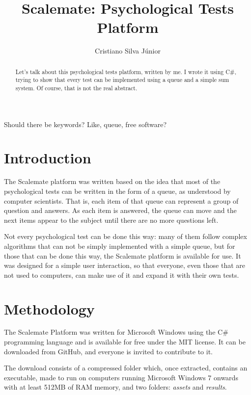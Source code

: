 \documentclass[12pt, a4paper, twoside]{article}
\begin{document}
\title{Scalemate: Psychological Tests Platform}
\author{Cristiano Silva Júnior}
\date{}
\maketitle

\begin{abstract}
Let's talk about this psychological tests platform, written by me. I wrote it
using C\#, trying to show that every test can be implemented using a queue
and a simple sum system. Of course, that is not the real abstract. 
\end{abstract}

Should there be keywords? Like, queue, free software?

\section{Introduction}

The Scalemate platform was written based on the idea that most of the psychological tests can be written in the form of a queue, as understood by computer scientists. That is, each item of that queue can represent a group of question and answers. As each item is answered, the queue can move and the next items appear to the subject until there are no more questions left. 

Not every psychological test can be done this way: many of them follow complex algorithms that can not be simply implemented with a simple queue, but for those that can be done this way, the Scalemate platform is available for use. It was designed for a simple user interaction, so that everyone, even those that are not used to computers, can make use of it and expand it with their own tests.

\section{Methodology}

The Scalemate Platform was written for Microsoft Windows using the C\# programming language and is available for free under the MIT license. It can be downloaded from GitHub, and everyone is invited to contribute to it.

The download consists of a compressed folder which, once extracted, contains an executable, made to run on computers running Microsoft Windows 7 onwards with at least 512MB of RAM memory, and two folders: \textit{assets} and \textit{results}. 
\end{document}
